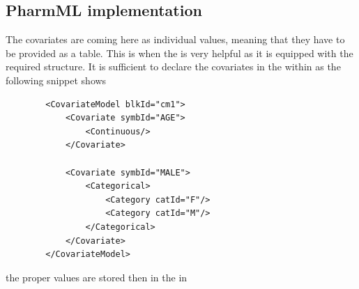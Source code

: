 \subsection*{PharmML implementation}
The covariates are coming here as individual values, meaning that they
have to be provided as a table. This is when the  is
very helpful as it is equipped with the required structure.
It is sufficient to declare the covariates in the  within 
 as the following snippet shows
\lstset{language=XML}
\begin{lstlisting}
        <CovariateModel blkId="cm1">
            <Covariate symbId="AGE">
                <Continuous/>
            </Covariate>
            
            <Covariate symbId="MALE">
                <Categorical>
                    <Category catId="F"/>
                    <Category catId="M"/>
                </Categorical>
            </Covariate>
        </CovariateModel>
\end{lstlisting}
the proper values are stored then in the  in 
\lstset{language=XML}
